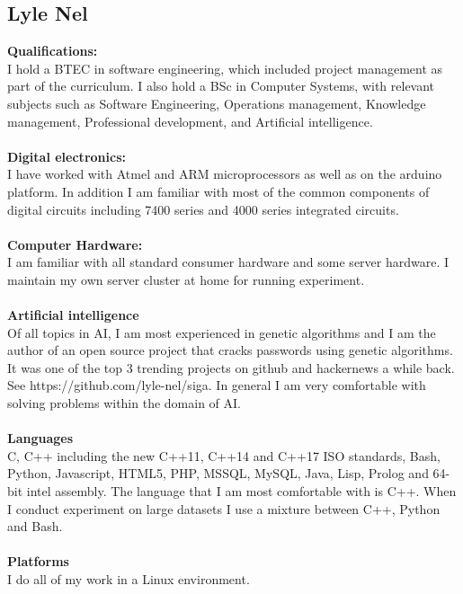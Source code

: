 \documentclass{article}
\begin{document}
\newpage
\subsection {Lyle Nel}
\textbf{Qualifications:} \\
I hold a BTEC in software engineering, which included project management as part of the curriculum.
I also hold a BSc in Computer Systems, with relevant subjects such as Software Engineering, Operations management, Knowledge management, Professional development, and Artificial intelligence.\\ \\
\textbf{Digital electronics:} \\
I have worked with Atmel and ARM microprocessors as well as on the arduino platform. In addition I am familiar with most of the common components of digital circuits including 7400 series and 4000 series integrated circuits. \\ \\
\textbf{Computer Hardware:} \\
I am familiar with all standard consumer hardware and some server hardware. I maintain my own server cluster at home for running experiment. \\ \\
\textbf{Artificial intelligence} \\
Of all topics in AI, I am most experienced in genetic algorithms and I am the author of an open source project that cracks passwords using genetic algorithms. It was one of the top 3 trending projects on github and hackernews a while back. See https://github.com/lyle-nel/siga. In general I am very comfortable with solving problems within the domain of AI. \\ \\
\textbf{Languages} \\
C, C++ including the new C++11, C++14 and C++17 ISO standards, Bash, Python, Javascript, HTML5, PHP, MSSQL, MySQL, Java, Lisp, Prolog and 64-bit intel assembly. The language that I am most comfortable with is C++. When I conduct experiment on large datasets I use a mixture between C++, Python and Bash. \\ \\
\textbf{Platforms} \\
I do all of my work in a Linux environment.

\newpage
\end{document}
